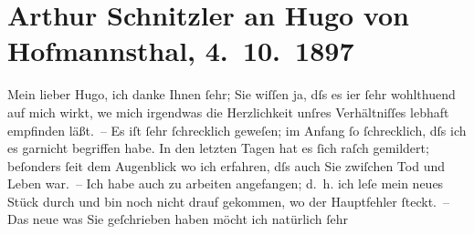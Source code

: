 

         
         \renewcommand{\erwaehntePersonen}{Personen: Hugo von Hofmannsthal}
         \renewcommand{\erwaehnteOrte}{Orte: Wien}
         \renewcommand{\erwaehnteWerke}{Werke: Das Vermächtnis. Schauspiel in drei Akten, Die Frau im Fenster, Die Hochzeit der Sobeide, Die Rede Gabriele d’Annunzios. Notizen von einer Reise im oberen Italien}
               \section[Arthur Schnitzler an Hugo von Hofmannsthal, 4. 10. 1897]{ Arthur Schnitzler an Hugo von Hofmannsthal, 4. 10. 1897}\nopagebreak{}\rehead{ }\begin{ledgroupsized}[t]{13cm}\normalsize\beginnumbering \toendnotes[C]{\smallbreak\pagebreak[2]} 
\toendnotes[C]{\smallbreak}\pstart
           \noindent{}{\pb}Mein lieber Hugo, ich danke Ihnen ſehr; Sie wiſſen ja, dſs es i{\geminationm}er ſehr wohlthuend auf mich wirkt, we{\geminationn} mich irgendwas die Herzlichkeit unſres Verhältniſſes
               lebhaft empfinden läßt. – Es iſt ſehr ſchrecklich geweſen; im Anfang ſo ſchrecklich,
                  {\pb}dſs ich es garnicht begriffen habe. In den letzten
               Tagen hat es ſich raſch gemildert; beſonders ſeit dem Augenblick wo ich erfahren, dſs
               auch Sie zwiſchen Tod und Leben war. –\pend
           \pstart
           Ich habe auch zu arbeiten angefangen; d. h. ich leſe mein neues Stück durch und bin noch nicht drauf
               gekommen, wo der Hauptfehler ſteckt. –\pend
           \pstart
           {\pb}Das neue was Sie geſchrieben haben möcht ich natürlich ſehr

\end{ledgroupsized}
